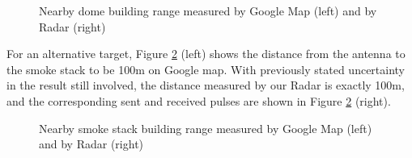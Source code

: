 \documentclass[letterpaper, 12 pt, conference]{report}
\numberwithin{figure}{section}
\begin{document}
\begin{figure}[h]
\centering{}
\caption{Nearby dome building range measured by Google Map (left) and by Radar (right)}
\label{fig:dome}
\end{figure}
\FloatBarrier
For an alternative target, Figure \ref{fig:midtower} (left) shows the distance from the antenna to the smoke stack to be 100m on Google map. With previously stated uncertainty in the result still involved, the distance measured by our Radar is exactly 100m, and the corresponding sent and received pulses are shown in Figure \ref{fig:midtower} (right).

\begin{figure}[h]
\centering{}
\caption{Nearby smoke stack building range measured by Google Map (left) and by Radar (right)}
\label{fig:midtower}
\end{figure}
\FloatBarrier
\end{document}
